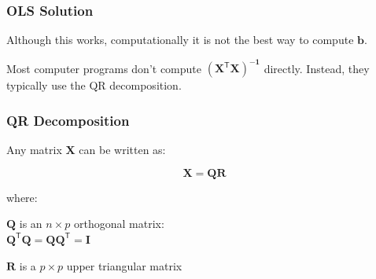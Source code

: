\documentclass[12pt]{beamer}\usepackage[]{graphicx}\usepackage[]{color}
\makeatletter
\newcommand{\hlcom}[1]{\textcolor[rgb]{0.678,0.584,0.686}{\textit{#1}}}%
\newcommand{\hlopt}[1]{\textcolor[rgb]{0,0,0}{#1}}%
\newcommand{\hlstd}[1]{\textcolor[rgb]{0.345,0.345,0.345}{#1}}%
\newcommand{\hlkwb}[1]{\textcolor[rgb]{0.69,0.353,0.396}{#1}}%
\newcommand{\hlkwd}[1]{\textcolor[rgb]{0.737,0.353,0.396}{\textbf{#1}}}%
\newenvironment{kframe}{%
 \def\at@end@of@kframe{}%
 \ifinner\ifhmode%
  \def\at@end@of@kframe{\end{minipage}}%
  \begin{minipage}{\columnwidth}%
 \fi\fi%
 \def\FrameCommand##1{\hskip\@totalleftmargin \hskip-\fboxsep
 \colorbox{shadecolor}{##1}\hskip-\fboxsep
     \hskip-\linewidth \hskip-\@totalleftmargin \hskip\columnwidth}%
 \MakeFramed {\advance\hsize-\width
   \@totalleftmargin\z@ \linewidth\hsize
   \@setminipage}}%
 {\par\unskip\endMakeFramed%
 \at@end@of@kframe}
\newenvironment{knitrout}{}{} %
\makeatother
\begin{document}

\begin{frame}
\begin{center}
\Huge{}
\end{center}
\end{frame}




\begin{frame}
\frametitle{OLS Solution}

Although this works, computationally it is not the best way to compute 
$\mathbf{b}$.

\bigskip
Most computer programs don't compute $\mathbf{(X^\mathsf{T} X)^{-1}}$ directly.
Instead, they typically use the QR decomposition.

\end{frame}


\begin{frame}
\frametitle{QR Decomposition}

Any matrix $\mathbf{X}$ can be written as:

$$
\mathbf{X = QR}
$$

where:

\bi
  \item $\mathbf{Q}$ is an $n \times p$ orthogonal matrix: \\
$\mathbf{Q^\mathsf{T} Q} = \mathbf{Q Q^\mathsf{T}} = \mathbf{I}$
  \item $\mathbf{R}$ is a $p \times p$ upper triangular matrix
\ei

\end{frame}
\end{document}

